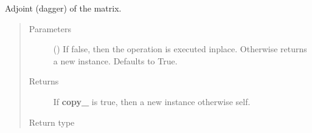 \documentclass[letterpaper,10pt,english]{sphinxmanual}
\begin{document}
\begin{fulllineitems}
\begin{fulllineitems}
\end{fulllineitems}


\begin{fulllineitems}
\label{\detokenize{qsim:qsim.matrix.OperatorMatrix.dag}}
Adjoint (dagger) of the matrix.
\begin{quote}\begin{description}
\item[{Parameters}] \leavevmode
{} (\sphinxstyleliteralemphasis{\sphinxupquote{, }}) \textendash{} If false, then the operation is executed inplace. Otherwise returns
a new instance. Defaults to True.

\item[{Returns}] \leavevmode
{} \textendash{} If {\color{red}\bfseries{}copy\_} is true, then a new instance otherwise self.

\item[{Return type}] \leavevmode
{\hyperref[\detokenize{qsim:qsim.matrix.OperatorMatrix}]{}}

\end{description}\end{quote}

\end{fulllineitems}



\end{fulllineitems}
\end{document}
